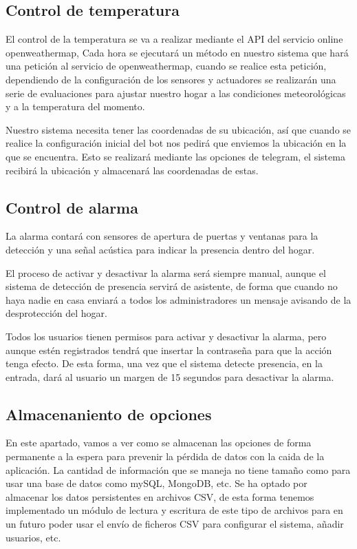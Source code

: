 \documentclass[10pt,journal,compsoc]{IEEEtran}
\begin{document}
\subsection{Control de temperatura}
El control de la temperatura se va a realizar mediante el API del servicio online openweathermap, 
Cada hora se ejecutará un método en nuestro sistema que hará una petición al 
servicio de openweathermap, cuando se realice esta petición, dependiendo de la 
configuración de los sensores y actuadores se realizarán una serie de 
evaluaciones para ajustar nuestro hogar a las condiciones meteorológicas y a la 
temperatura del momento.

Nuestro sistema necesita tener las coordenadas de su ubicación, así que cuando 
se realice la configuración inicial del bot nos pedirá que enviemos la ubicación 
en la que se encuentra. Esto se realizará mediante las opciones de telegram, el 
sistema recibirá la ubicación y almacenará las coordenadas de estas.

\subsection{Control de alarma}
La alarma contará con sensores de apertura de puertas y ventanas para la 
detección y una señal acústica para indicar la presencia dentro del hogar.

El proceso de activar y desactivar la alarma será siempre manual, aunque el 
sistema de detección de presencia servirá de asistente, de forma que cuando no 
haya nadie en casa enviará a todos los administradores un mensaje avisando de la 
desprotección del hogar. 

Todos los usuarios tienen permisos para activar y desactivar la alarma, pero 
aunque estén registrados tendrá que insertar la contraseña para que la acción 
tenga efecto. De esta forma, una vez que el sistema detecte presencia, en la 
entrada, dará al usuario un margen de 15 segundos para desactivar la alarma.

\subsection{Almacenaniento de opciones}
En este apartado, vamos a ver como se almacenan las opciones de forma permanente a la 
espera para prevenir la pérdida de datos con la caida de la aplicación. La cantidad de 
información que se maneja no tiene tamaño como para usar una base de datos como 
mySQL, MongoDB, etc. 
Se ha optado por almacenar los datos persistentes en archivos CSV, de esta forma 
tenemos implementado un módulo de lectura y escritura de este tipo de archivos para 
en un futuro poder usar el envío de ficheros CSV para configurar el sistema, añadir usuarios, etc.
\end{document}
